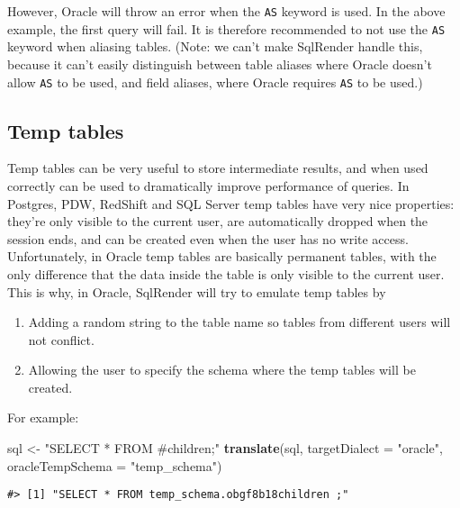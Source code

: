 \documentclass[
]{article}
\newenvironment{Shaded}{\begin{snugshade}}{\end{snugshade}}
\newcommand{\DataTypeTok}[1]{\textcolor[rgb]{0.13,0.29,0.53}{#1}}
\newcommand{\KeywordTok}[1]{\textcolor[rgb]{0.13,0.29,0.53}{\textbf{#1}}}
\newcommand{\NormalTok}[1]{#1}
\newcommand{\StringTok}[1]{\textcolor[rgb]{0.31,0.60,0.02}{#1}}
\providecommand{\tightlist}{%
  \setlength{\itemsep}{0pt}\setlength{\parskip}{0pt}}
\begin{document}
However, Oracle will throw an error when the \texttt{AS} keyword is
used. In the above example, the first query will fail. It is therefore
recommended to not use the \texttt{AS} keyword when aliasing tables.
(Note: we can't make SqlRender handle this, because it can't easily
distinguish between table aliases where Oracle doesn't allow \texttt{AS}
to be used, and field aliases, where Oracle requires \texttt{AS} to be
used.)

\hypertarget{temp-tables}{%
\subsection{Temp tables}\label{temp-tables}}

Temp tables can be very useful to store intermediate results, and when
used correctly can be used to dramatically improve performance of
queries. In Postgres, PDW, RedShift and SQL Server temp tables have very
nice properties: they're only visible to the current user, are
automatically dropped when the session ends, and can be created even
when the user has no write access. Unfortunately, in Oracle temp tables
are basically permanent tables, with the only difference that the data
inside the table is only visible to the current user. This is why, in
Oracle, SqlRender will try to emulate temp tables by

\begin{enumerate}
\def\labelenumi{\arabic{enumi}.}
\tightlist
\item
  Adding a random string to the table name so tables from different
  users will not conflict.
\item
  Allowing the user to specify the schema where the temp tables will be
  created.
\end{enumerate}

For example:

\begin{Shaded}
\begin{Highlighting}[]
\NormalTok{sql <-}\StringTok{ "SELECT * FROM #children;"}
\KeywordTok{translate}\NormalTok{(sql, }\DataTypeTok{targetDialect =} \StringTok{"oracle"}\NormalTok{, }\DataTypeTok{oracleTempSchema =} \StringTok{"temp_schema"}\NormalTok{)}
\end{Highlighting}
\end{Shaded}

\begin{verbatim}
#> [1] "SELECT * FROM temp_schema.obgf8b18children ;"
\end{verbatim}
\end{document}

